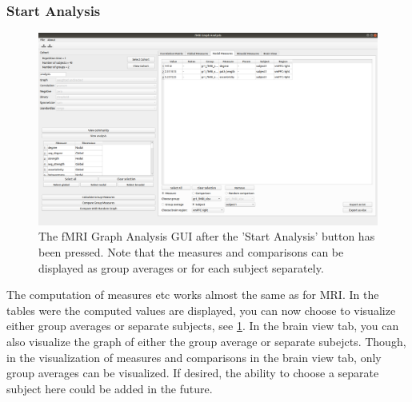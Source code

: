 \documentclass{article}
\begin{document}
\subsubsection{Start Analysis}

\begin{figure}[h]
    \centering
    \includegraphics[width=\linewidth]{fmri_sa.png}
    \caption{The fMRI Graph Analysis GUI after the 'Start Analysis' button has been pressed. Note that the measures and comparisons can be displayed as group averages or for each subject separately.}
    \label{fig:fmri_sa}
\end{figure}

The computation of measures etc works almost the same as for MRI. In  the tables were the computed values are displayed, you can now choose to visualize either group averages or separate subjects, see \cref{fig:fmri_sa}. In the brain view tab, you can also visualize the graph of either the group average or separate subejcts. Though, in the visualization of measures and comparisons in the brain view tab, only group averages can be visualized. If desired, the ability to choose a separate subject here could be added in the future.
\end{document}
